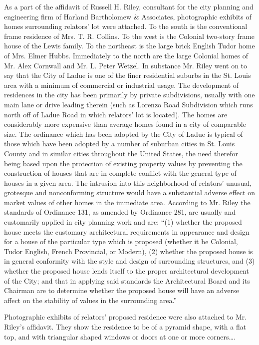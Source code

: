 As a part of the affidavit of Russell H. Riley, consultant for the city planning
and engineering firm of Harland Bartholomew \& Associates, photographic exhibits
of homes surrounding relators' lot were attached. To the south is the
conventional frame residence of Mrs. T. R. Collins. To the west is the Colonial
two-story frame house of the Lewis family. To the northeast is the large brick
English Tudor home of Mrs. Elmer Hubbs. Immediately to the north are the large
Colonial homes of Mr. Alex Cornwall and Mr. L. Peter Wetzel. In substance Mr.
Riley went on to say that the City of Ladue is one of the finer residential
suburbs in the St. Louis area with a minimum of commercial or industrial usage.
The development of residences in the city has been primarily by private
subdivisions, usually with one main lane or drive leading therein (such as
Lorenzo Road Subdivision which runs north off of Ladue Road in which relators'
lot is located). The homes are considerably more expensive than average homes
found in a city of comparable size. The ordinance which has been adopted by the
City of Ladue is typical of those which have been adopted by a number of
suburban cities in St. Louis County and in similar cities throughout the United
States, the need therefor being based upon the protection of existing property
values by preventing the construction of houses that are in complete conflict
with the general type of houses in a given area. The intrusion into this
neighborhood of relators' unusual, grotesque and nonconforming structure would
have a substantial adverse effect on market values of other homes in the
immediate area. According to Mr. Riley the standards of Ordinance 131, as
amended by Ordinance 281, are usually and customarily applied in city planning
work and are: ``(1) whether the proposed house meets the customary architectural
requirements in appearance and design for a house of the particular type which
is proposed (whether it be Colonial, Tudor English, French Provincial, or
Modern), (2) whether the proposed house is in general conformity with the style
and design of surrounding structures, and (3) whether the proposed house lends
itself to the proper architectural development of the City; and that in applying
said standards the Architectural Board and its Chairman are to determine whether
the proposed house will have an adverse affect on the stability of values in the
surrounding area.''

Photographic exhibits of relators' proposed residence were also attached to Mr.
Riley's affidavit. They show the residence to be of a pyramid shape, with a flat
top, and with triangular shaped windows or doors at one or more corners\ldots .

